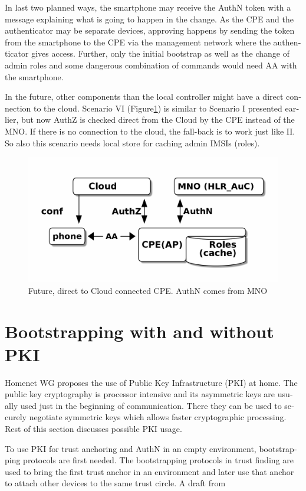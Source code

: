 \documentclass[12pt,a4paper,english]{tutthesis}
\begin{document}
\begin{otherlanguage}{english}
In last two planned ways, the smartphone may receive the AuthN token
with a message explaining what is going to happen in the change.  As
the CPE and the authenticator may be separate devices, approving
happens by sending the token from the smartphone to the CPE via the
management network where the authenticator gives access.  Further,
only the initial bootstrap as well as the change of admin roles and
some dangerous combination of commands would need AA with the
smartphone.


\label{scenario-iv} 
In the future, other components than  the  local controller might 
have a direct connection to the cloud. 
Scenario VI (Figure\ref{fig:scenario-VI}) is similar to Scenario I presented
earlier, but now AuthZ is checked direct from the Cloud by the CPE instead of
the MNO.  If there is no connection to the cloud, the fall-back is to work
just like II. So also this scenario needs local store for caching
admin IMSIs (roles).

\begin{figure}[htb]
\centering
\includegraphics[width=.9\linewidth]{scenVI.png}
\caption{\label{fig:scenario-VI}Future, direct to Cloud connected CPE. AuthN comes from MNO}
\end{figure}


\section{Bootstrapping with and without PKI}
\label{sec-6-7}
\label{bootstrapping}


Homenet WG proposes the use of Public Key Infrastructure (PKI) at 
home. The public key cryptography is processor intensive and its
asymmetric keys are usually used just in the beginning of
communication. There they can be used to securely negotiate symmetric
keys which allows faster cryptographic processing.
Rest of this section discusses possible PKI usage.

To use PKI for trust anchoring and AuthN in an empty environment, bootstrapping protocols are
first needed.
The bootstrapping protocols in trust finding are used to
bring the first trust anchor in an environment and later use that anchor to
attach other devices to the same trust circle.  A draft from


\end{otherlanguage}
\end{document}
